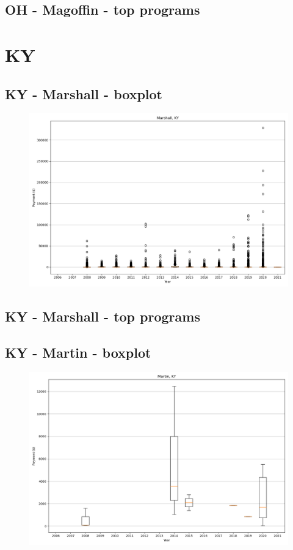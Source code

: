 \subsection*{OH - Magoffin - top programs}

\newpage
\section*{KY}
\subsection*{KY - Marshall - boxplot}
\begin{figure}[h]
\centering
\includegraphics[width=7in]{../output/boxplots/counties/Marshall-KY_boxplot.png}
\end{figure}


\subsection*{KY - Marshall - top programs}

\newpage
\subsection*{KY - Martin - boxplot}
\begin{figure}[h]
\centering
\includegraphics[width=7in]{../output/boxplots/counties/Martin-KY_boxplot.png}
\end{figure}


